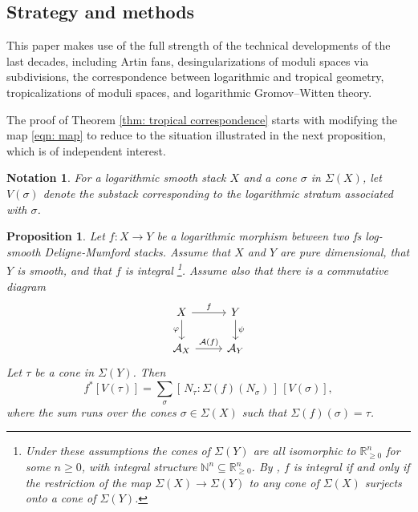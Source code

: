 \documentclass{article}
\newtheorem{proposition}[definition]{Proposition}
\newtheorem{notation}[definition]{Notation}
\begin{document}
\subsection{Strategy and methods}

This paper makes use of the full strength of the technical developments of the last decades, including Artin fans, desingularizations of moduli spaces via subdivisions, the correspondence between logarithmic and tropical geometry, tropicalizations of moduli spaces, and logarithmic Gromov--Witten theory.

The proof of Theorem \eqref{thm: tropical correspondence} starts with modifying the map \eqref{eqn: map} to reduce to the situation illustrated in the next proposition, which is of independent interest.

\begin{notation}
    For a logarithmic smooth stack $X$ and a cone $\sigma$ in $\Sigma(X)$, let $V(\sigma)$ 
    denote the substack corresponding to the logarithmic stratum associated with $\sigma$.
\end{notation}

\begin{proposition}\label{prop: technical tool}
    Let $f : X \to Y$ be a logarithmic morphism between two fs log-smooth Deligne-Mumford stacks. 
    Assume that $X$ and $Y$ are pure dimensional, that $Y$ is smooth, and that $f$ is integral \footnote{Under these assumptions the cones of $\Sigma(Y)$ are all isomorphic to $\mathbb{R}_{\ge 0}^n$ for some $n \ge 0$, with integral structure $\mathbb{N}^n \subseteq \mathbb{R}_{\ge 0}^n$. By \cite[Proposition~2.4]{Mirror-GS}, $f$ is integral if and only if the restriction of the map
    $
    \Sigma(X) \to \Sigma(Y)
    $
    to any cone of $\Sigma(X)$ surjects onto a cone of $\Sigma(Y)$.}. Assume also that there is a commutative diagram
    \begin{equation}\label{eqn: artin-fan-diagram}
\begin{tikzcd}
X 
\arrow[r, "f"] 
\arrow[d, "\varphi"']               
& Y
\arrow[d, "\psi"]     \\
\mathcal{A}_{X} 
\arrow[r, "\mathcal{A}(f)"] 
& \mathcal{A}_{Y}
\end{tikzcd}
\end{equation}
    Let $\tau$ be a cone in $\Sigma(Y)$. Then
\[
f^*[V(\tau)] = \sum_{\sigma} [\, N_\tau: \Sigma(f)(N_\sigma) \,]\,[V(\sigma)],
\]
where the sum runs over the cones $\sigma \in \Sigma(X)$ such that 
$\Sigma(f)(\sigma) = \tau$.
\end{proposition}
\end{document}
